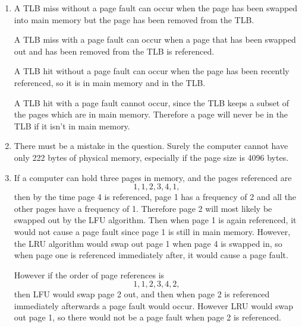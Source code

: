 \documentclass[fleqn]{article}
\newenvironment{answers}{ %
	\begin{enumerate}
		\setlength{\itemsep}{\bigskipamount}
}{	\end{enumerate}	}
\begin{document}
\begin{answers}
\begin{enumerate}
		\item %
		if CPU utilization is at 87 percent and disk utilization is at 3 percent, the CPU utilization is good, and the paging algorithm is good because there are few page faults. The degree of multiprogramming can be increased.

		\item %
		if CPU utilization is at 13 percent and disk utilization is at 3 percent, the CPU utilization is too low, so the degree of multiprogramming should be increased. The paging algorithm is good because there are few page faults.
	\end{enumerate}

	\item %
	A TLB miss without a page fault can occur when the page has been swapped into main memory but the page has been removed from the TLB.

	A TLB miss with a page fault can occur when a page that has been swapped out and has been removed from the TLB is referenced.

	A TLB hit without a page fault can occur when the page has been recently referenced, so it is in main memory and in the TLB.

	A TLB hit with a page fault cannot occur, since the TLB keeps a subset of the pages which are in main memory. Therefore a page will never be in the TLB if it isn't in main memory.

	\item %
	There must be a mistake in the question. Surely the computer cannot have only 222 bytes of physical memory, especially if the page size is 4096 bytes.

	\item %
	If a computer can hold three pages in memory, and the pages referenced are
	\[1, 1, 2, 3, 4, 1,\]
	then by the time page 4 is referenced, page 1 has a frequency of 2 and all the other pages have a frequency of 1. Therefore page 2 will most likely be swapped out by the LFU algorithm. Then when page 1 is again referenced, it would not cause a page fault since page 1 is still in main memory. However, the LRU algorithm would swap out page 1 when page 4 is swapped in, so when page one is referenced immediately after, it would cause a page fault.

	However if the order of page references is
	\[1, 1, 2, 3, 4, 2,\]
	then LFU would swap page 2 out, and then when page 2 is referenced immediately afterwards a page fault would occur. However LRU would swap out page 1, so there would not be a page fault when page 2 is referenced.


\end{answers}
\end{document}
